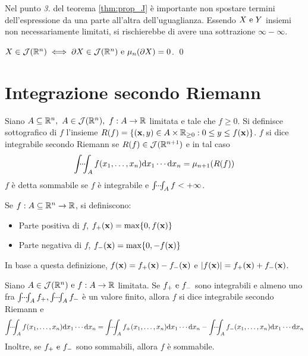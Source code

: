 \begin{remark}
    Nel punto \textit{3.} del teorema \ref{thm:prop_J} è importante non spostare termini dell'espressione da una parte all'altra dell'uguaglianza. Essendo $X \text{ e } Y$ insiemi non necessariamente limitati, si rischierebbe di avere una sottrazione $\infty - \infty$.
\end{remark}

\begin{lemma}
    $X \in \mathcal{J}(\mathbb{R}^n) \iff \partial X \in \mathcal{J}(\mathbb{R}^n) \text{ e } \mu_n(\partial X)=0$.
    \qed
\end{lemma}

\section{Integrazione secondo Riemann}

\begin{definition}
    Siano $A \subseteq \mathbb{R}^n, \ A \in \mathcal{J}(\mathbb{R}^n), \ f: A \to \mathbb{R}$ limitata e tale che $f \geq 0$. Si definisce sottografico di $f$ l'insieme $R(f)=\{(\vb{x}, y)\in A \times \mathbb{R}_{\geq 0} : 0 \leq y \leq f(\vb{x})\}$.
    $f$ si dice integrabile secondo Riemann se $R(f) \in \mathcal{J}(\mathbb{R}^{n+1})$ e in tal caso
    $$
        \idotsint_A f(x_1,\dots,x_n)\dd x_1\cdots \dd x_n=\mu_{n+1}(R(f))
    $$
    $f$ è detta sommabile se $f$ è integrabile e $\idotsint_Af < +\infty$.
\end{definition}

\begin{definition}
    \label{def:ppos_pneg}
    Se $f:A \subseteq \mathbb{R}^n \to \mathbb{R}$, si definiscono:
    \begin{itemize}
        \item Parte positiva di $f$, $f_+(\vb{x})=\max\{0,f(\vb{x})\}$
        \item Parte negativa di $f$, $f_-(\vb{x})=\max\{0,-f(\vb{x})\}$
    \end{itemize}
    In base a questa definizione, $f(\vb{x})=f_+(\vb{x})-f_-(\vb{x})$ e $\abs{f(\vb{x})}=f_+(\vb{x})+f_-(\vb{x})$.
\end{definition}

\begin{definition}
    Siano $A \in \mathcal{J}(\mathbb{R}^n) \text{ e } f: A \to \mathbb{R}$ limitata. Se $f_+ \text{ e } f_-$ sono integrabili e almeno uno fra $\idotsint_A f_+, \idotsint_A f_-$ è un valore finito, allora $f$ si dice integrabile secondo Riemann e
    $$
        \idotsint_Af(x_1,\dots,x_n)\dd x_1\cdots \dd x_n = \idotsint_A f_+(x_1,\dots,x_n)\dd x_1\cdots \dd x_n - \idotsint_A f_-(x_1,\dots,x_n)\dd x_1\cdots \dd x_n
    $$
    Inoltre, se $f_+ \text{ e } f_-$ sono sommabili, allora $f$ è sommabile.
\end{definition}

